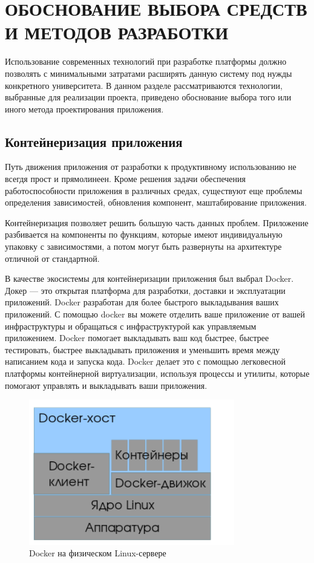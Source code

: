 \section{ОБОСНОВАНИЕ ВЫБОРА СРЕДСТВ И МЕТОДОВ РАЗРАБОТКИ}

Использование современных технологий при разработке платформы должно позволять
с минимальными затратами расширять данную систему под нужды конкретного университета.
В данном разделе рассматриваются технологии, выбранные для реализации проекта,
приведено обоснование выбора того или иного метода проектирования приложения.

\subsection{Контейнеризация приложения}

Путь движения приложения от разработки к продуктивному использованию не всегдя прост и
прямолинеен. Кроме решения задачи обеспечения работоспособности приложения в различных
средах, существуют еще проблемы определения зависимостей, обновления компонент,
маштабирование приложения.

Контейнеризация позволяет решить большую часть данных проблем. Приложение разбивается
на компоненты по функциям, которые имеют индивидуальную упаковку с зависимостями,
а потом могут быть развернуты на архитектуре отличной от стандартной.

В качестве экосистемы для контейнеризации приложения был выбрал Docker. Докер — это открытая
платформа для разработки, доставки и эксплуатации приложений. Docker разработан для более
быстрого выкладывания ваших приложений. С помощью docker вы можете отделить ваше приложение
от вашей инфраструктуры и обращаться с инфраструктурой как управляемым приложением.
Docker помогает выкладывать ваш код быстрее, быстрее тестировать, быстрее выкладывать
приложения и уменьшить время между написанием кода и запуска кода. Docker делает
это с помощью легковесной платформы контейнерной виртуализации, используя процессы и
утилиты, которые помогают управлять и выкладывать ваши приложения.

\begin{figure}
  \centering
  \includegraphics[width=0.8\textwidth]{images/docker.png}
  \caption{Docker на физическом Linux-сервере\label{docker}}
\end{figure}

